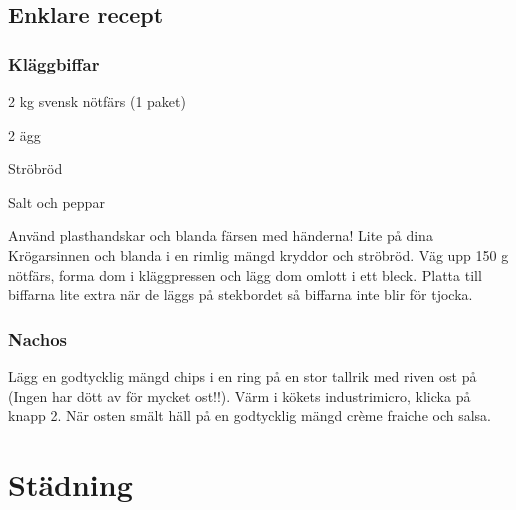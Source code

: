 \documentclass[10pt]{article}
\begin{document}
	\subsection{Enklare recept}
\subsubsection*{Kläggbiffar}
\begin{dashlist}
	\item 2 kg svensk nötfärs (1 paket)
    \item 2 ägg
    \item Ströbröd
    \item Salt och peppar
\end{dashlist}
Använd plasthandskar och blanda färsen med händerna! Lite på dina Krögarsinnen och blanda i en rimlig mängd kryddor och ströbröd. Väg upp 150 g nötfärs, forma dom i kläggpressen och lägg dom omlott i ett bleck. Platta till biffarna lite extra när de läggs på stekbordet så biffarna inte blir för tjocka.

\subsubsection*{Nachos}
Lägg en godtycklig mängd chips i en ring på en stor tallrik med riven ost på (Ingen
har dött av för mycket ost!!). Värm i kökets industrimicro, klicka på knapp 2. När osten smält häll på en godtycklig mängd crème fraiche och salsa.

\section{Städning}
\end{document}
